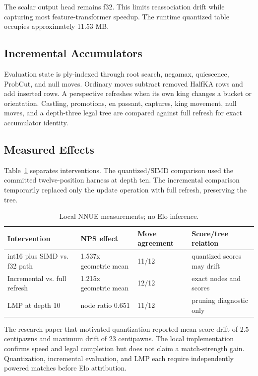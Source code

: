 \documentclass[conference]{IEEEtranSSP}
\begin{document}
The scalar output head remains f32. This limits reassociation drift while capturing most feature-transformer speedup. The runtime quantized table occupies approximately 11.53 MB.

\subsection{Incremental Accumulators}
Evaluation state is ply-indexed through root search, negamax, quiescence, ProbCut, and null moves. Ordinary moves subtract removed HalfKA rows and add inserted rows. A perspective refreshes when its own king changes a bucket or orientation. Castling, promotions, en passant, captures, king movement, null moves, and a depth-three legal tree are compared against full refresh for exact accumulator identity.

\subsection{Measured Effects}
Table~\ref{tab:nnue} separates interventions. The quantized/SIMD comparison used the committed twelve-position harness at depth ten. The incremental comparison temporarily replaced only the update operation with full refresh, preserving the tree.

\begin{table}[t]
\caption{Local NNUE measurements; no Elo inference.}
\label{tab:nnue}
\centering
\scriptsize
\begin{tabular}{|p{}|p{}|p{}|p{}|}
\hline
Intervention & NPS effect & Move agreement & Score/tree relation \\
\hline
int16 plus SIMD vs. f32 path & 1.537x geometric mean & 11/12 & quantized scores may drift \\
\hline
Incremental vs. full refresh & 1.215x geometric mean & 12/12 & exact nodes and scores \\
\hline
LMP at depth 10 & node ratio 0.651 & 11/12 & pruning diagnostic only \\
\hline
\end{tabular}
\end{table}

The research paper that motivated quantization reported mean score drift of 2.5 centipawns and maximum drift of 23 centipawns. The local implementation confirms speed and legal completion but does not claim a match-strength gain. Quantization, incremental evaluation, and LMP each require independently powered matches before Elo attribution.
\end{document}
